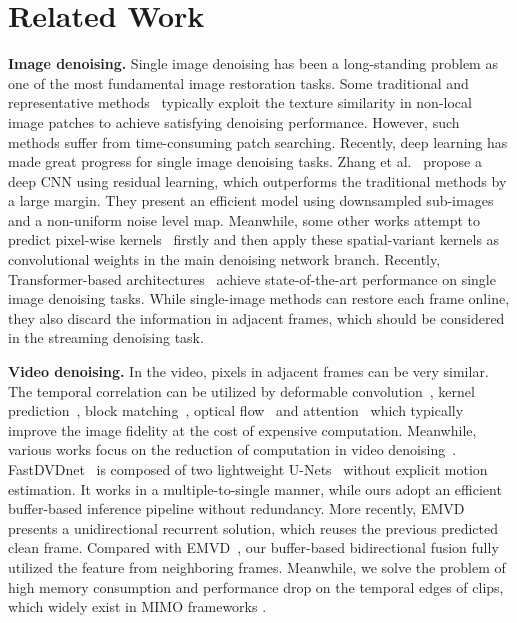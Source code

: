 \documentclass[sigconf]{acmart}
\begin{document}
\section{Related Work}


\textbf{Image denoising. }
Single image denoising has been a long-standing problem as one of the most fundamental image restoration tasks. Some traditional and representative methods~\cite{Dabov2007imagedenoising,Maggioni2013NonlocalTF,Buades2011Non-Local,Lebrun2013Nonlocal} typically exploit the texture similarity in non-local image patches to achieve satisfying denoising performance. However, such methods suffer from time-consuming patch searching. Recently, deep learning has made great progress for single image denoising tasks. Zhang et al.~\cite{zhang2017beyond} propose a deep CNN using residual learning, which outperforms the traditional methods by a large margin. They present an efficient model using downsampled sub-images and a non-uniform noise level map. Meanwhile, some other works attempt to predict pixel-wise kernels~\cite{Mildenhall2018Burst,Xia2020Basis,Lu2021Efficient} firstly and then apply these spatial-variant kernels as convolutional weights in the main denoising network branch. 
Recently, Transformer-based architectures~\cite{liang2021swinir,Zamir2021Restormer} achieve state-of-the-art performance on single image denoising tasks.
While single-image methods can restore each frame online, they also discard the information in adjacent frames, which should be considered in the streaming denoising task.



\textbf{Video denoising.}
In the video, pixels in adjacent frames can be very similar. The temporal correlation can be utilized by deformable convolution~\cite{Wang2019EDVR}, kernel prediction~\cite{Mildenhall2018Burst,Xia2020Basis}, block matching~\cite{Maggioni2012VBM4D,Vaksman2021Patch}, optical flow~\cite{tassano2019dvdnet} and attention~\cite{liang2022vrt} which typically improve the image fidelity 
at the cost of expensive computation.
Meanwhile, various works focus on the reduction of computation in video denoising~\cite{Tassano2020FastDVDNet,Maggioni2021Efficient}. FastDVDnet~\cite{Tassano2020FastDVDNet} is composed of two lightweight U-Nets~\cite{Ronneberger2015U-Net} without explicit motion estimation. 
It works in a multiple-to-single manner, while ours adopt an efficient buffer-based inference pipeline without redundancy. 
More recently, EMVD~\cite{Maggioni2021Efficient} presents a unidirectional recurrent solution, which reuses the previous predicted clean frame.
Compared with EMVD~\cite{Maggioni2021Efficient}, our buffer-based bidirectional fusion fully utilized the feature from neighboring frames. 
Meanwhile, we solve the problem of high memory consumption and performance drop on the temporal edges of clips, which widely exist in MIMO frameworks \cite{Xiang2022ReMoNet, liang2022vrt, chan2021basicvsr}.
\end{document}
